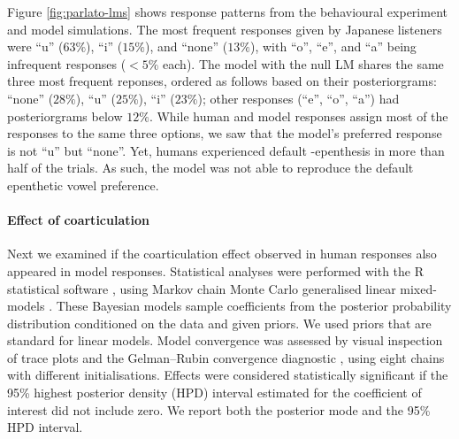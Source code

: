 {Figure \ref{fig:parlato-lms} shows response patterns from the behavioural experiment and model simulations. The most frequent responses given by Japanese listeners were ``u'' ($63\%$), ``i'' ($15\%$), and ``none'' ($13\%$), with ``o'', ``e'', and ``a'' being infrequent responses ($<5\%$ each). The model with the null LM shares the same three most frequent reponses, ordered as follows based on their posteriorgrams: ``none'' ($28\%$), ``u'' ($25\%$), ``i'' ($23\%$); other responses (``e'', ``o'', ``a'') had posteriorgrams below $12\%$. While human and model responses assign most of the responses to the same three options, we saw that the model's preferred response is not ``u'' but ``none''. Yet, humans experienced default -epenthesis in more than half of the trials. As such, the model was not able to reproduce the default epenthetic vowel preference.          




\paragraph{Effect of coarticulation}

Next we examined if the coarticulation effect observed in human responses also appeared in model responses. Statistical analyses were performed with the R statistical software \cite{R-base}, using Markov chain Monte Carlo generalised linear mixed-models \cite{R-MCMCglmm, R-coda}. These Bayesian models sample coefficients from the posterior probability distribution conditioned on the data and given priors. We used priors that are standard for linear models. Model convergence was assessed by visual inspection of trace plots and the Gelman–Rubin convergence diagnostic \cite{gelman1992}, using eight chains with different initialisations. Effects were considered statistically significant if the 95\% highest posterior density (HPD) interval estimated for the coefficient of interest did not include zero. We report both the posterior mode and the 95\% HPD interval.  

}
